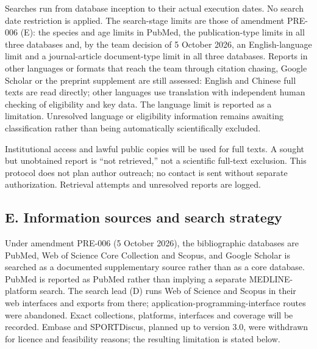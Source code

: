 \documentclass[
  11pt,
  a4paper,
]{article}
\begin{document}
Searches run from database inception to their actual execution dates. No
search date restriction is applied. The search-stage limits are those of
amendment PRE-006 (E): the species and age limits in PubMed, the
publication-type limits in all three databases and, by the team decision
of 5 October 2026, an English-language limit and a journal-article
document-type limit in all three databases. Reports in other languages
or formats that reach the team through citation chasing, Google Scholar
or the preprint supplement are still assessed: English and Chinese full
texts are read directly; other languages use translation with
independent human checking of eligibility and key data. The language
limit is reported as a limitation. Unresolved language or eligibility
information remains awaiting classification rather than being
automatically scientifically excluded.

Institutional access and lawful public copies will be used for full
texts. A sought but unobtained report is ``not retrieved,'' not a
scientific full-text exclusion. This protocol does not plan author
outreach; no contact is sent without separate authorization. Retrieval
attempts and unresolved reports are logged.

\subsection{E. Information sources and search
strategy}\label{e.-information-sources-and-search-strategy}

Under amendment PRE-006 (5 October 2026), the bibliographic databases
are PubMed, Web of Science Core Collection and Scopus, and Google
Scholar is searched as a documented supplementary source rather than as
a core database. PubMed is reported as PubMed rather than implying a
separate MEDLINE-platform search. The search lead (D) runs Web of
Science and Scopus in their web interfaces and exports from there;
application-programming-interface routes were abandoned. Exact
collections, platforms, interfaces and coverage will be recorded. Embase
and SPORTDiscus, planned up to version 3.0, were withdrawn for licence
and feasibility reasons; the resulting limitation is stated below.
\end{document}
